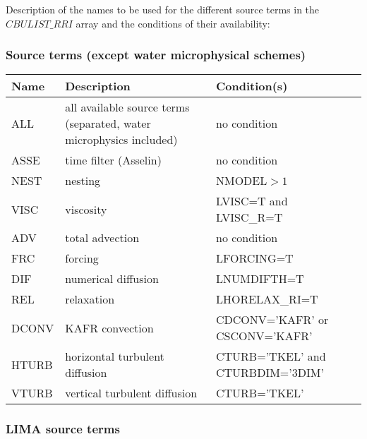 Description of the names to be used for the different source terms in the $CBULIST\_RRI$ array and the conditions of their availability:

\subsubsection{Source terms (except water microphysical schemes)}

\begin{longtable} {|p{}|p{}|p{}|}
\hline
Name & Description & Condition(s) \\
\hline \hline
\endhead
ALL    & all available source terms (separated,  water microphysics included) & no condition \\\hline \hline
ASSE   & time filter (Asselin)          & no condition                     \\\hline
NEST   & nesting                        & NMODEL$>1$                       \\\hline
VISC   & viscosity                      & LVISC=T and LVISC\_R=T           \\\hline
ADV    & total advection                & no condition                     \\\hline
FRC    & forcing                        & LFORCING=T                       \\\hline
DIF    & numerical diffusion            & LNUMDIFTH=T                      \\\hline
REL    & relaxation                     & LHORELAX\_RI=T                   \\\hline
DCONV  & KAFR convection                & CDCONV='KAFR' or CSCONV='KAFR'   \\\hline
HTURB  & horizontal turbulent diffusion & CTURB='TKEL' and CTURBDIM='3DIM' \\\hline
VTURB  & vertical turbulent diffusion   & CTURB='TKEL'                     \\\hline
\end{longtable}

\subsubsection{LIMA source terms}


